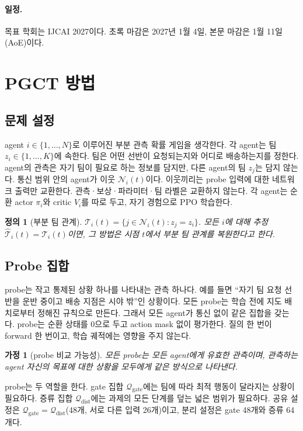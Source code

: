 \documentclass[11pt]{article}
\newtheorem{assumption}{가정}
\newtheorem{definition}{정의}
\begin{document}
\paragraph{일정.} 목표 학회는 IJCAI 2027이다. 초록 마감은 2027년 1월 4일, 본문 마감은 1월 11일(AoE)이다.

\section{PGCT 방법}

\subsection{문제 설정}
agent $i \in \{1,\dots,N\}$로 이루어진 부분 관측 확률 게임을 생각한다. 각 agent는 팀 $z_i \in \{1,\dots,K\}$에 속한다.
팀은 어떤 선반이 요청되는지와 어디로 배송하는지를 정한다.
agent의 관측은 자기 팀이 필요로 하는 정보를 담지만, 다른 agent의 팀 $z_j$는 담지 않는다.
통신 범위 안의 agent가 이웃 $\mathcal{N}_i(t)$이다.
이웃끼리는 probe 입력에 대한 네트워크 출력만 교환한다. 관측·보상·파라미터·팀 라벨은 교환하지 않는다.
각 agent는 순환 actor $\pi_i$와 critic $V_i$를 따로 두고, 자기 경험으로 PPO 학습한다.

\begin{definition}[부분 팀 관계]
$\mathcal{T}_i(t) = \{ j \in \mathcal{N}_i(t) : z_j = z_i \}$. 모든 $i$에 대해 추정 $\hat{\mathcal{T}}_i(t) = \mathcal{T}_i(t)$이면, 그 방법은 시점 $t$에서 부분 팀 관계를 복원한다고 한다.
\end{definition}

\subsection{Probe 집합}
probe는 작고 통제된 상황 하나를 나타내는 관측 하나다. 예를 들면 ``자기 팀 요청 선반을 운반 중이고 배송 지점은 시야 밖''인 상황이다.
모든 probe는 학습 전에 지도 배치로부터 정해진 규칙으로 만든다. 그래서 모든 agent가 통신 없이 같은 집합을 갖는다.
probe는 순환 상태를 0으로 두고 action mask 없이 평가한다. 질의 한 번이 forward 한 번이고, 학습 궤적에는 영향을 주지 않는다.

\begin{assumption}[probe 비교 가능성]
모든 probe는 모든 agent에게 유효한 관측이며, 관측하는 agent 자신의 목표에 대한 상황을 모두에게 같은 방식으로 나타낸다.
\end{assumption}

probe는 두 역할을 한다. gate 집합 $\mathcal{Q}_{\mathrm{gate}}$에는 팀에 따라 최적 행동이 달라지는 상황이 필요하다.
증류 집합 $\mathcal{Q}_{\mathrm{dist}}$에는 과제의 모든 단계를 덮는 넓은 범위가 필요하다.
공유 설정은 $\mathcal{Q}_{\mathrm{gate}} = \mathcal{Q}_{\mathrm{dist}}$(48개, 서로 다른 입력 26개)이고, 분리 설정은 gate 48개와 증류 64개다.
\end{document}
